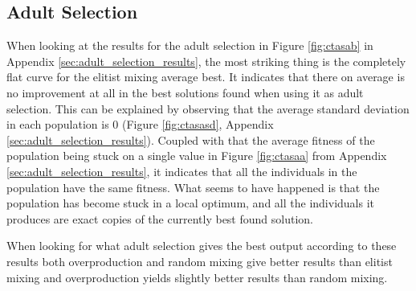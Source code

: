 
\subsection{Adult Selection} %
\label{sub:adult_selection}

When looking at the results for the adult selection in Figure \ref{fig:ctasab} in Appendix \ref{sec:adult_selection_results}, the most striking thing is the completely flat curve for the elitist mixing average best. It indicates that there on average is no improvement at all in the best solutions found when using it as adult selection. This can be explained by observing that the average standard deviation in each population is 0 (Figure \ref{fig:ctasasd}, Appendix \ref{sec:adult_selection_results}). Coupled with that the average fitness of the population being stuck on a single value in Figure \ref{fig:ctasaa} from Appendix \ref{sec:adult_selection_results}, it indicates that all the individuals in the population have the same fitness. What seems to have happened is that the population has become stuck in a local optimum, and all the individuals it produces are exact copies of the currently best found solution.

When looking for what adult selection gives the best output according to these results both overproduction and random mixing give better results than elitist mixing and overproduction yields slightly better results than random mixing.




